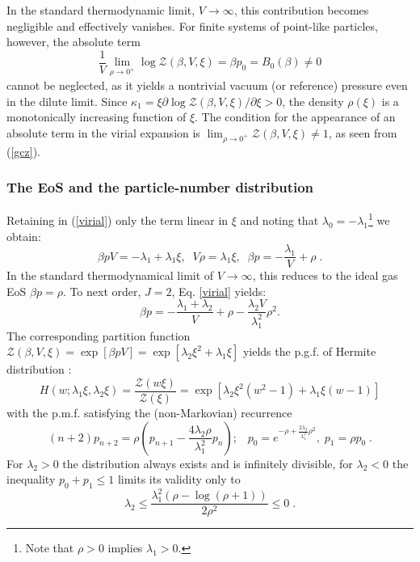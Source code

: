 \documentclass[a4paper,12pt]{amsart}
\theoremstyle{definition}
\theoremstyle{remark}
\begin{document}
In the standard thermodynamic limit, $V \to \infty$, this contribution becomes negligible and effectively vanishes. For finite systems of point-like particles, however, the absolute term
\[
\frac{1}{V} \lim_{\rho \to 0^+} \log \mathcal{Z}(\beta, V, \xi) 
= \beta p_0 
= B_0(\beta) \neq 0
\]
cannot be neglected, as it yields a nontrivial vacuum (or reference) pressure even in the dilute limit.
Since $\kappa_1 = \xi \partial\log {\mathcal{Z}(\beta,V,\xi)}/\partial \xi >0$, the density $\rho(\xi)$ is a monotonically increasing function of $\xi$. The condition for the appearance of an absolute term in the virial expansion is $\lim_{\rho\to 0^+} \mathcal{Z}(\beta, V,\xi)  \neq 1$, as seen from   (\ref{gcz}).

\subsubsection{The EoS and the particle-number  distribution}\label{virEx}
Retaining in (\ref{virial}) only the term linear  in $\xi$ and noting that $\lambda_0=-\lambda_1$\footnote{Note that  $\rho>0$ implies $\lambda_1>0$.} we obtain:
\[
\beta pV =-\lambda_1+\lambda_1 \xi,\;\; V\rho=\lambda_1 \xi,\;\; \beta p =-\frac{\lambda_1}{V}+\rho\;.
\]
 In the standard thermodynamical limit of $V\to \infty $, this reduces to the ideal gas EoS $\beta p =\rho$. To  next order, $J\!=\!2$, Eq. \ref{virial} yields:
\[  \beta p = -\frac{\lambda_1+\lambda_2}{V}+\rho  
-\frac{\lambda_2 V}{\lambda_1^2}\rho ^2.
\] 
The corresponding partition function $\mathcal{Z}(\beta,V,\xi)\!=\!\exp[\beta p V]
\!=\!\exp\left[\lambda_2\xi^2+\lambda_1\xi\right]$ yields the p.g.f. of Hermite distribution \cite{JKK2005}: 
\begin{equation}\label{Hermite_pgf}
H(w;\lambda_1\xi,\lambda_2\xi)=\frac{\mathcal{Z}(w\xi)}{\mathcal{Z}(\xi)}=
\exp\left[\lambda_2\xi^2(w^2-1)+\lambda_1\xi(w-1)\right]
\end{equation}
with the p.m.f. satisfying the (non-Markovian) recurrence
\[
(n+2)p_{n+2}=\rho \left(p_{n+1}-\frac{4\lambda_2 \rho}{\lambda_1^2} p_n\right);\;\; \; p_0=e^{-\rho+\frac{2\lambda_2}{\lambda_1^2}\rho^2},\; p_1=\rho p_0\;.
\]
For $\lambda_2>0$ the distribution always exists and is infinitely divisible, for $\lambda_2<0$  the inequality $p_0+p_1\leq 1$ limits its validity only to 
\[
\lambda_2\leq \frac{\lambda_1^2 \left(\rho -\log (\rho +1)\right)}{2 \rho ^2}\leq 0\;.
\]
\end{document}
